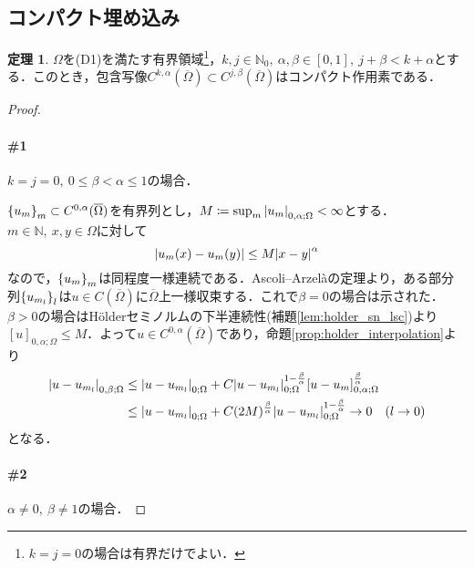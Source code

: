 \documentclass[a4paper]{ltjsarticle}
\newcommand{\Nset}{\mathbb{N}}
\newcommand{\Om}{\Omega}
\newcommand{\Ombar}{\overline{\Omega}}
\newcommand{\1}{\mathbbm{1}}
\numberwithin{equation}{section}
\theoremstyle{definition}
\newtheorem{thm}{定理}[section]
\begin{document}
\subsection{コンパクト埋め込み}
\begin{thm}\label{thm:holder_cpt_emb}
    $\Om$を(D1)を満たす有界領域\footnote{$k=j=0$の場合は有界だけでよい．}，$k,j\in\Nset_0,\ \alpha,\beta\in[0,1],\ j+\beta<k+\alpha$とする．このとき，包含写像$C^{k,\alpha}(\Ombar)\subset C^{j,\beta}(\Ombar)$はコンパクト作用素である．
\end{thm}
\begin{proof}
    \paragraph*{\#1}$k=j=0,\ 0\leq \beta<\alpha\leq 1$の場合．

    $\qty{u_m}_{m}\subset C^{0,\alpha}(\Ombar)$を有界列とし，$M\coloneqq \sup_{m}\abs{u_m}_{0,\alpha;\Om}<\infty$とする．$m\in\Nset,\ x,y\in\Om$に対して
    \begin{equation}
        \abs{u_m(x)-u_m(y)}\leq M\abs{x-y}^\alpha 
    \end{equation}
    なので，$\qty{u_m}_{m}$は同程度一様連続である．Ascoli--Arzelàの定理より，ある部分列$\qty{u_{m_l}}_l$は$u\in C(\Ombar)$に$\Ombar$上一様収束する．これで$\beta=0$の場合は示された．$\beta>0$の場合はHölderセミノルムの下半連続性(補題\ref{lem:holder_sn_lsc})より$[u]_{0,\alpha;\Om}\leq M$．よって$u\in C^{0,\alpha}(\Ombar)$であり，命題\ref{prop:holder_interpolation}より
    \begin{align}
        \abs{u-u_{m_l}}_{0,\beta;\Om}&\leq \abs{u-u_{m_l}}_{0;\Om}+C\abs{u-u_{m_l}}_{0;\Om}^{1-\frac{\beta}{\alpha}}[u-u_m]_{0,\alpha;\Om}^{\frac{\beta}{\alpha}}\\
        &\leq \abs{u-u_{m_l}}_{0;\Om}+C(2M)^{\frac{\beta}{\alpha}}\abs{u-u_{m_l}}_{0;\Om}^{1-\frac{\beta}{\alpha}}\to 0\quad (l\to 0)
    \end{align}
    となる．

    \paragraph*{\#2}$\alpha\neq0,\ \beta\neq1$の場合．


\end{proof}
\end{document}
